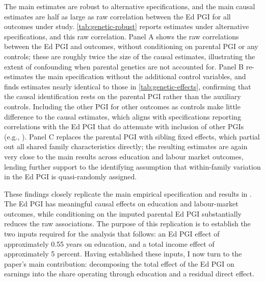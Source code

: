 The main estimates are robust to alternative specifications, and the main causal estimates are half as large as  raw correlation between the Ed PGI for all outcomes under study.
\autoref{tab:genetic-robust} reports estimates under alternative 
specifications, and this raw correlation.
Panel A shows the raw correlations between the Ed PGI and outcomes, without 
conditioning on parental PGI or any controls; these are roughly twice the size of the causal estimates, illustrating the extent of confounding when parental genetics are not accounted for.
Panel B re-estimates the main specification without the additional control variables, and finds estimates nearly identical to those in \autoref{tab:genetic-effects}, confirming that the causal identification rests on the parental PGI rather than the auxiliary controls.
Including the other PGI for other outcomes as controls make little difference to the causal estimates, which aligns with specifications reporting correlations with the Ed PGI that do attenuate with inclusion of other PGIs (e.g., \citealt{bolyard2025understanding}).
Panel C replaces the parental PGI with sibling fixed effects, which partial out all shared family characteristics directly; the resulting estimates are again very close to the main results across education and labour market outcomes, lending further support to the identifying assumption that within-family variation in the Ed PGI is quasi-randomly assigned.

These findings closely replicate the main empirical specification and results in \citet{carvalho2024genetics}.
The Ed PGI has meaningful causal effects on education and labour-market outcomes, while conditioning on the imputed parental Ed PGI substantially reduces the raw associations. The purpose of this replication is to establish the two inputs required for the analysis that follows: an Ed PGI effect of approximately 0.55 years on education, and a total income effect of approximately 5 percent.
Having established these inputs, I now turn to the paper's main contribution: decomposing the total effect of the Ed PGI on earnings into the share operating through education and a residual direct effect.
